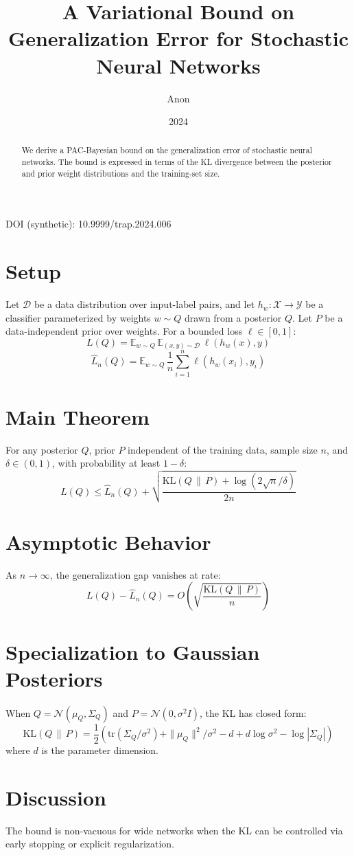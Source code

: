 \documentclass[11pt]{article}
\title{A Variational Bound on Generalization Error for Stochastic Neural Networks}
\author{Anon}
\date{2024}
\begin{document}
\maketitle
\noindent DOI (synthetic): 10.9999/trap.2024.006

\begin{abstract}
We derive a PAC-Bayesian bound on the generalization error of stochastic neural networks. The bound is expressed in terms of the KL divergence between the posterior and prior weight distributions and the training-set size.
\end{abstract}

\section{Setup}
Let $\mathcal{D}$ be a data distribution over input-label pairs, and let $h_w : \mathcal{X} \to \mathcal{Y}$ be a classifier parameterized by weights $w \sim Q$ drawn from a posterior $Q$. Let $P$ be a data-independent prior over weights. For a bounded loss $\ell \in [0,1]$:
\begin{equation}
L(Q) = \mathbb{E}_{w \sim Q}\, \mathbb{E}_{(x,y)\sim \mathcal{D}}\, \ell(h_w(x), y) \tag{true risk}
\end{equation}
\begin{equation}
\hat{L}_n(Q) = \mathbb{E}_{w \sim Q}\, \frac{1}{n} \sum_{i=1}^{n} \ell(h_w(x_i), y_i) \tag{empirical risk}
\end{equation}

\section{Main Theorem}
For any posterior $Q$, prior $P$ independent of the training data, sample size $n$, and $\delta \in (0,1)$, with probability at least $1-\delta$:
\begin{equation}
L(Q) \le \hat{L}_n(Q) + \sqrt{\frac{\mathrm{KL}(Q \,\|\, P) + \log(2\sqrt{n}/\delta)}{2n}}
\end{equation}

\section{Asymptotic Behavior}
As $n \to \infty$, the generalization gap vanishes at rate:
\[
L(Q) - \hat{L}_n(Q) = O\!\left(\sqrt{\frac{\mathrm{KL}(Q \,\|\, P)}{n}}\right)
\]

\section{Specialization to Gaussian Posteriors}
When $Q = \mathcal{N}(\mu_Q, \Sigma_Q)$ and $P = \mathcal{N}(0, \sigma^2 I)$, the KL has closed form:
\begin{equation}
\mathrm{KL}(Q \,\|\, P) = \frac{1}{2}\left( \mathrm{tr}(\Sigma_Q / \sigma^2) + \|\mu_Q\|^2 / \sigma^2 - d + d \log \sigma^2 - \log |\Sigma_Q| \right)
\end{equation}
where $d$ is the parameter dimension.

\section{Discussion}
The bound is non-vacuous for wide networks when the KL can be controlled via early stopping or explicit regularization.
\end{document}
